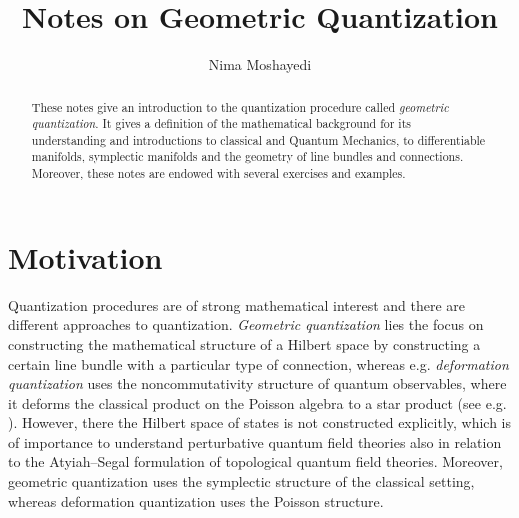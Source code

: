 \documentclass[11pt]{amsart}
\numberwithin{equation}{section}
\theoremstyle{plain}
\theoremstyle{definition}
\theoremstyle{remark}
\begin{document}
\title[Notes on Geometric Quantization]{
Notes on Geometric Quantization}
\author[N. Moshayedi]{Nima Moshayedi}
\address{Institut f\"ur Mathematik\\ Universit\"at Z\"urich\\ 
Winterthurerstrasse 190
CH-8057 Z\"urich}

\maketitle

%
%

\begin{abstract}
These notes give an introduction to the quantization procedure called \emph{geometric quantization}. It gives a definition of the mathematical background for its understanding and introductions to classical and Quantum Mechanics, to differentiable manifolds, symplectic manifolds and the geometry of line bundles and connections. Moreover, these notes are endowed with several exercises and examples.
\end{abstract}

\tableofcontents


\section{Motivation}
Quantization procedures are of strong mathematical interest and there are different approaches to quantization. \emph{Geometric quantization} \cite{GuilleminSternberg1982,Kir85,Wood97,BatesWeinstein2012} lies the focus on constructing the mathematical structure of a Hilbert space by constructing a certain line bundle with a particular type of connection, whereas e.g. \emph{deformation quantization} \cite{Weyl1931,Moy,DeWildeLecomte1983,Fedosov1994,K,CalaquePantevToenVaquieVezzosi2017} uses the noncommutativity structure of quantum observables, where it deforms the classical product on the Poisson algebra to a star product (see e.g. \cite{GuttRawnsleySternheimer2005}). However, there the Hilbert space of states is not constructed explicitly, which is of importance to understand perturbative quantum field theories also in relation to the Atyiah--Segal formulation \cite{Atiyah1988,Segal1988} of topological quantum field theories. 
Moreover, geometric quantization uses the symplectic structure of the classical setting, whereas deformation quantization uses the Poisson structure. 
\end{document}
